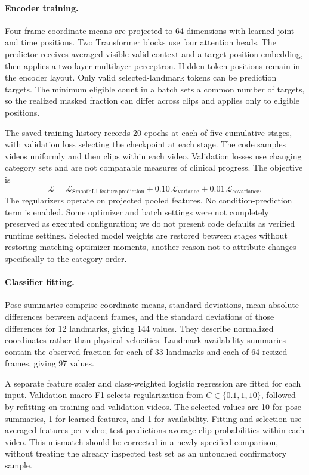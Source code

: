 \documentclass{article}
\begin{document}
\paragraph{Encoder training.}
Four-frame coordinate means are projected to 64 dimensions with learned joint and time positions. Two Transformer blocks use four attention heads. The predictor receives averaged visible-valid context and a target-position embedding, then applies a two-layer multilayer perceptron. Hidden token positions remain in the encoder layout. Only valid selected-landmark tokens can be prediction targets. The minimum eligible count in a batch sets a common number of targets, so the realized masked fraction can differ across clips and applies only to eligible positions.

The saved training history records 20 epochs at each of five cumulative stages, with validation loss selecting the checkpoint at each stage. The code samples videos uniformly and then clips within each video. Validation losses use changing category sets and are not comparable measures of clinical progress. The objective is
\[
\mathcal L=\mathcal L_{\mathrm{SmoothL1\ feature\ prediction}}
+0.10\,\mathcal L_{\mathrm{variance}}
+0.01\,\mathcal L_{\mathrm{covariance}}.
\]
The regularizers operate on projected pooled features. No condition-prediction term is enabled. Some optimizer and batch settings were not completely preserved as executed configuration; we do not present code defaults as verified runtime settings. Selected model weights are restored between stages without restoring matching optimizer moments, another reason not to attribute changes specifically to the category order.

\paragraph{Classifier fitting.}
Pose summaries comprise coordinate means, standard deviations, mean absolute differences between adjacent frames, and the standard deviations of those differences for 12 landmarks, giving 144 values. They describe normalized coordinates rather than physical velocities. Landmark-availability summaries contain the observed fraction for each of 33 landmarks and each of 64 resized frames, giving 97 values.

A separate feature scaler and class-weighted logistic regression are fitted for each input. Validation macro-F1 selects regularization from $C\in\{0.1,1,10\}$, followed by refitting on training and validation videos. The selected values are 10 for pose summaries, 1 for learned features, and 1 for availability. Fitting and selection use averaged features per video; test predictions average clip probabilities within each video. This mismatch should be corrected in a newly specified comparison, without treating the already inspected test set as an untouched confirmatory sample.
\end{document}
